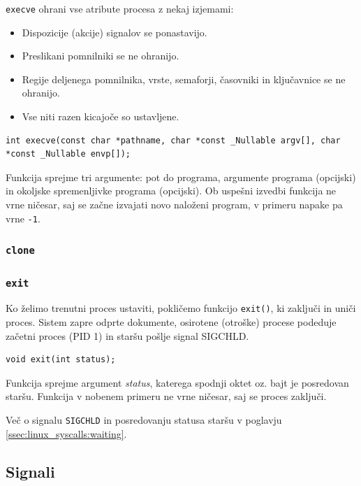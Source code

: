 \documentclass[a4paper,12pt,openright]{book}
\begin{document}
\texttt{execve} ohrani vse atribute procesa z nekaj izjemami:
\begin{itemize}
	\item Dispozicije (akcije) signalov se ponastavijo.
	\item Preslikani pomnilniki se ne ohranijo.
	\item Regije deljenega pomnilnika, vrste, semaforji, časovniki in ključavnice se ne ohranijo.
	\item Vse niti razen kicajoče so ustavljene.
\end{itemize}

\begin{lstlisting}[style=func]
 int execve(const char *pathname, char *const _Nullable argv[], char *const _Nullable envp[]);
\end{lstlisting}

Funkcija sprejme tri argumente: pot do programa, argumente programa (opcijski) in okoljske spremenljivke programa (opcijski).
Ob uspešni izvedbi funkcija ne vrne ničesar, saj se začne izvajati novo naloženi program, v primeru napake pa vrne \texttt{-1}.

\subsubsection{\texttt{clone}}

\subsubsection{\texttt{exit}}

Ko želimo trenutni proces ustaviti, pokličemo funkcijo \texttt{exit()}, ki zaključi in uniči proces.
Sistem zapre odprte dokumente, osirotene (otroške) procese podeduje začetni proces (PID 1) in staršu pošlje signal SIGCHLD.

\begin{lstlisting}[style=func]
 void exit(int status);
\end{lstlisting}

Funkcija sprejme argument \textit{status}, katerega spodnji oktet oz. bajt je posredovan staršu.
Funkcija v nobenem primeru ne vrne ničesar, saj se proces zaključi.

Več o signalu \texttt{SIGCHLD} in posredovanju statusa staršu v poglavju \ref{ssec:linux_syscalls:waiting}.

\subsection{Signali}
\end{document}
